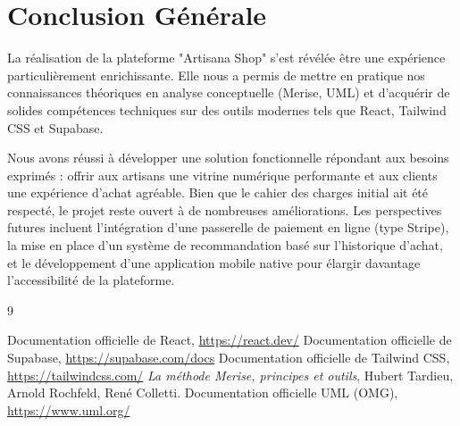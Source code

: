 \documentclass[12pt,a4paper]{report}
\begin{document}
\chapter*{Conclusion Générale}
La réalisation de la plateforme "Artisana Shop" s'est révélée être une expérience particulièrement enrichissante. Elle nous a permis de mettre en pratique nos connaissances théoriques en analyse conceptuelle (Merise, UML) et d'acquérir de solides compétences techniques sur des outils modernes tels que React, Tailwind CSS et Supabase.

Nous avons réussi à développer une solution fonctionnelle répondant aux besoins exprimés : offrir aux artisans une vitrine numérique performante et aux clients une expérience d'achat agréable. Bien que le cahier des charges initial ait été respecté, le projet reste ouvert à de nombreuses améliorations. Les perspectives futures incluent l'intégration d'une passerelle de paiement en ligne (type Stripe), la mise en place d'un système de recommandation basé sur l'historique d'achat, et le développement d'une application mobile native pour élargir davantage l'accessibilité de la plateforme.

\begin{thebibliography}{9}
 Documentation officielle de React, \url{https://react.dev/}
 Documentation officielle de Supabase, \url{https://supabase.com/docs}
 Documentation officielle de Tailwind CSS, \url{https://tailwindcss.com/}
 \emph{La méthode Merise, principes et outils}, Hubert Tardieu, Arnold Rochfeld, René Colletti.
 Documentation officielle UML (OMG), \url{https://www.uml.org/}
\end{thebibliography}
\end{document}
